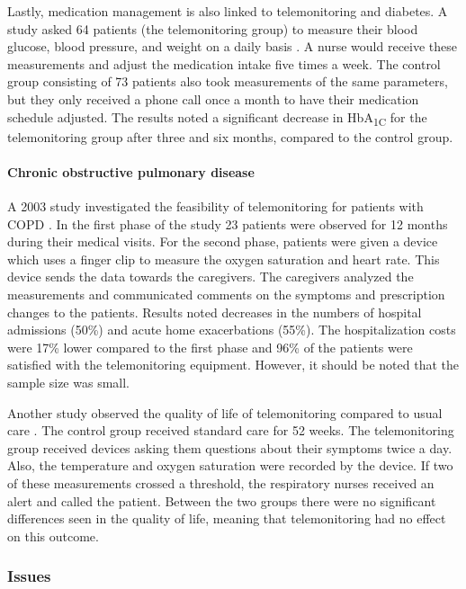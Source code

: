         Lastly, medication management is also linked to telemonitoring and diabetes. A study asked 64 patients (the telemonitoring group) to measure their blood glucose, blood pressure, and weight on a daily basis \cite{stone2009active}. A nurse would receive these measurements and adjust the medication intake five times a week. The control group consisting of 73 patients also took measurements of the same parameters, but they only received a phone call once a month to have their medication schedule adjusted. The results noted a significant decrease in HbA\textsubscript{1C} for the telemonitoring group after three and six months, compared to the control group.

        \paragraph{Chronic obstructive pulmonary disease} A 2003 study investigated the feasibility of telemonitoring for patients with COPD \cite{maiolo2003home}. In the first phase of the study 23 patients were observed for 12 months during their medical visits. For the second phase, patients were given a device which uses a finger clip to measure the oxygen saturation and heart rate. This device sends the data towards the caregivers. The caregivers analyzed the measurements and communicated comments on the symptoms and prescription changes to the patients. Results noted decreases in the numbers of hospital admissions (50\%) and acute home exacerbations (55\%). The hospitalization costs were 17\% lower compared to the first phase and 96\% of the patients were satisfied with the telemonitoring equipment. However, it should be noted that the sample size was small.

        Another study observed the quality of life of telemonitoring compared to usual care \cite{lewis2010home}. The control group received standard care for 52 weeks. The telemonitoring group received devices asking them questions about their symptoms twice a day. Also, the temperature and oxygen saturation were recorded by the device. If two of these measurements crossed a threshold, the respiratory nurses received an alert and called the patient. Between the two groups there were no significant differences seen in the quality of life, meaning that telemonitoring had no effect on this outcome.

        \subsubsection{Issues}

